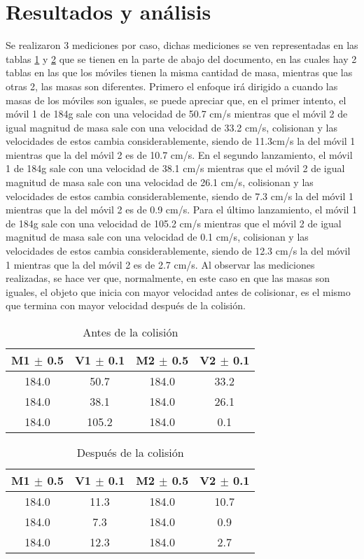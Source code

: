 \documentclass{article}
\begin{document}
\section{Resultados y análisis}\label{Resultados}			%
Se realizaron 3 mediciones por caso, dichas mediciones se ven representadas en las tablas \ref{tab:colision} y \ref{tab:colision_despues} que se tienen en la parte de abajo del documento, en las cuales hay 2 tablas en las que los móviles tienen la misma cantidad de masa, mientras que las otras 2, las masas son diferentes. Primero el enfoque irá dirigido a cuando las masas de los móviles son iguales, se puede apreciar que, en el primer intento, el móvil 1 de 184g sale con una velocidad de 50.7 cm/s mientras que el móvil 2 de igual magnitud de masa sale con una velocidad de 33.2 cm/s, colisionan y las velocidades de estos cambia considerablemente, siendo de 11.3cm/s la del móvil 1 mientras que la del móvil 2 es de 10.7 cm/s. En el segundo lanzamiento, el móvil 1 de 184g sale con una velocidad de 38.1 cm/s mientras que el móvil 2 de igual magnitud de masa sale con una velocidad de 26.1 cm/s, colisionan y las velocidades de estos cambia considerablemente, siendo de 7.3 cm/s la del móvil 1 mientras que la del móvil 2 es de 0.9 cm/s. Para el último lanzamiento, el móvil 1 de 184g sale con una velocidad de 105.2 cm/s mientras que el móvil 2 de igual magnitud de masa sale con una velocidad de 0.1 cm/s, colisionan y las velocidades de estos cambia considerablemente, siendo de  12.3 cm/s la del móvil 1 mientras que la del móvil 2 es de 2.7 cm/s. Al observar las mediciones realizadas, se hace ver que, normalmente, en este caso en que las masas son iguales, el objeto que inicia con mayor velocidad antes de colisionar, es el mismo que termina con mayor velocidad después de la colisión. 

\begin{table}[H]
\centering
\begin{tabular}{|c|c|c|c|}
\hline
M1 $\pm$ 0.5 & V1 $\pm$ 0.1 & M2 $\pm$ 0.5 & V2 $\pm$ 0.1 \\
\hline
184.0 & 50.7 & 184.0 & 33.2 \\
\hline
184.0 & 38.1 & 184.0 & 26.1 \\
\hline
184.0 & 105.2 & 184.0 & 0.1 \\
\hline
\end{tabular}
\caption{Antes de la colisión}
\label{tab:colision}
\end{table}

\begin{table}[H]
\centering
\begin{tabular}{|c|c|c|c|}
\hline
M1 $\pm$ 0.5 & V1 $\pm$ 0.1 & M2 $\pm$ 0.5 & V2 $\pm$ 0.1 \\
\hline
184.0 & 11.3 & 184.0 & 10.7 \\
\hline
184.0 & 7.3 & 184.0 & 0.9 \\
\hline
184.0 & 12.3 & 184.0 & 2.7 \\
\hline
\end{tabular}
\caption{Después de la colisión}
\label{tab:colision_despues}
\end{table}
\end{document}
